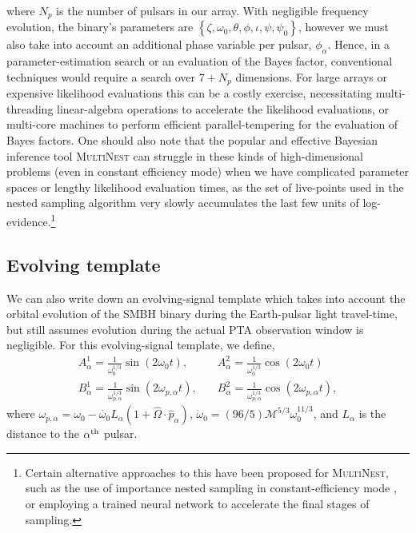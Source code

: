 \documentclass[prd,twocolumn,showpacs,nofootinbib]{revtex4}
\begin{document}
where $N_p$ is the number of pulsars in our array. With negligible frequency evolution, the binary's parameters are $\left\{\zeta,\omega_0,\theta,\phi,\iota,\psi,\psi_0\right\}$, however we must also take into account an additional phase variable per pulsar, $\phi_{\alpha}$. Hence, in a parameter-estimation search or an evaluation of the Bayes factor, conventional techniques would require a search over $7+N_{p}$ dimensions. For large arrays or expensive likelihood evaluations this can be a costly exercise, necessitating multi-threading linear-algebra operations to accelerate the likelihood evaluations, or multi-core machines to perform efficient parallel-tempering for the evaluation of Bayes factors. One should also note that the popular and effective Bayesian inference tool \textsc{MultiNest} can struggle in these kinds of high-dimensional problems (even in constant efficiency mode) when we have complicated parameter spaces or lengthy likelihood evaluation times, as the set of live-points used in the nested sampling algorithm very slowly accumulates the last few units of log-evidence.\footnote{Certain alternative approaches to this have been proposed for \textsc{MultiNest}, such as the use of importance nested sampling in constant-efficiency mode \citep{importanceMultiNest2013}, or employing a trained neural network \citep{skynet} to accelerate the final stages of sampling.}

\subsection{Evolving template}

We can also write down an evolving-signal template which takes into account the orbital evolution of the SMBH binary during the Earth-pulsar light travel-time, but still assumes evolution during the actual PTA observation window is negligible. For this evolving-signal template, we define,
\begin{align}
A^1_{\alpha} = \frac{1}{\omega_0^{1/3}}\sin(2\omega_0 t),&\quad A^2_{\alpha} = \frac{1}{\omega_0^{1/3}}\cos(2\omega_0 t) \nonumber\\
B^1_{\alpha} = \frac{1}{\omega_{p,\alpha}^{1/3}}\sin(2\omega_{p,\alpha} t),&\quad B^2_{\alpha} = \frac{1}{\omega_{p,\alpha}^{1/3}}\cos(2\omega_{p,\alpha} t),
\end{align}
where $\omega_{p,\alpha} = \omega_0 - \dot{\omega_0}L_{\alpha}(1+\hat{\Omega}\cdot\hat{p}_{\alpha})$, $\dot\omega_0 = (96/5)\mathcal{M}^{5/3}\omega_0^{11/3}$, and $L_{\alpha}$ is the distance to the $\alpha^{\rm th}$ pulsar. 
\end{document}
